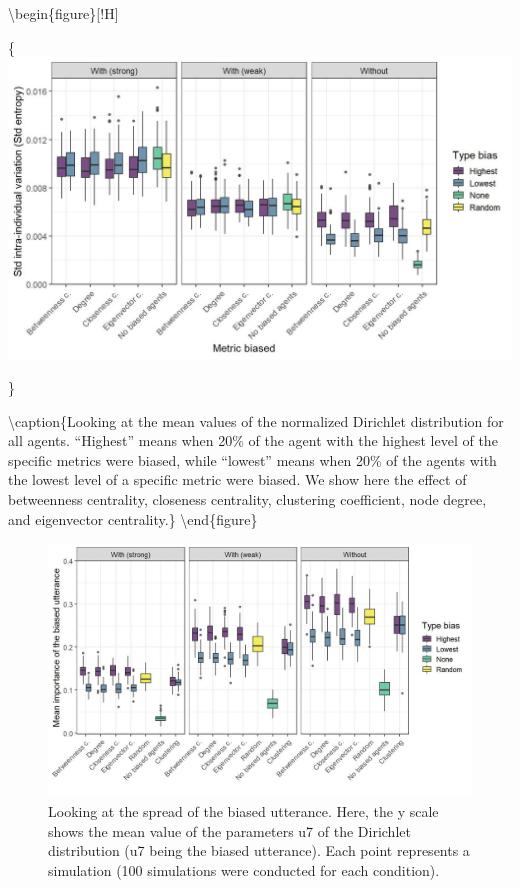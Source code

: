 \documentclass[
]{article}
\begin{document}
\textbackslash begin\{figure\}{[}!H{]}

\{\centering \includegraphics{./Figures/unnamed-chunk-204-1}

\}

\textbackslash caption\{Looking at the mean values of the normalized
Dirichlet distribution for all agents. ``Highest'' means when 20\% of
the agent with the highest level of the specific metrics were biased,
while ``lowest'' means when 20\% of the agents with the lowest level of
a specific metric were biased. We show here the effect of betweenness
centrality, closeness centrality, clustering coefficient, node degree,
and eigenvector centrality.\}\label{fig:unnamed-chunk-204}
\textbackslash end\{figure\}

\begin{figure}[!H]

{\centering \includegraphics{./Figures/unnamed-chunk-205-1} 

}

\caption{Looking at the spread of the biased utterance. Here, the y scale shows the mean value of the parameters u7 of the Dirichlet distribution (u7 being the biased utterance). Each point represents a simulation (100 simulations were conducted for each condition). }\label{fig:unnamed-chunk-205}
\end{figure}
\end{document}
